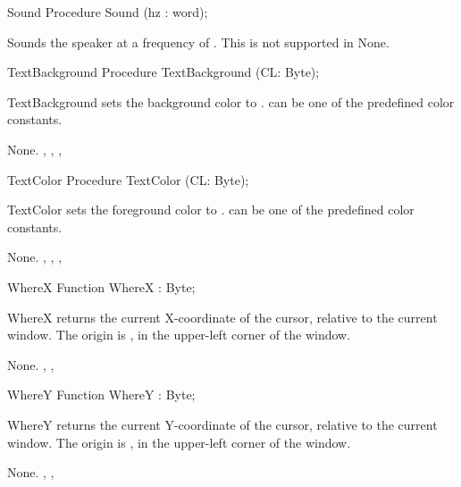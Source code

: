  \html{}
\begin{procedure}{Sound}
\Declaration
Procedure Sound (hz : word);

\Description
 Sounds the speaker at a frequency of .
This is not supported in \linux
\Errors
None.
\SeeAlso
{}
\end{procedure}
\begin{procedure}{TextBackground}
\Declaration
Procedure TextBackground (CL: Byte);

\Description

TextBackground sets the background color to .  can be one of the
predefined color constants.

\Errors
None.
\SeeAlso
 , , ,
\end{procedure}
 \html{}
\begin{procedure}{TextColor}
\Declaration
Procedure TextColor (CL: Byte);

\Description

TextColor sets the foreground color to .  can be one of the
predefined color constants.

\Errors
None.
\SeeAlso
 , , ,
\end{procedure}
 \html{}
\begin{function}{WhereX}
\Declaration
Function WhereX  : Byte;

\Description

WhereX returns the current X-coordinate of the cursor, relative to the
current window. The origin is , in the upper-left corner of the
window.

\Errors
None.
\SeeAlso
 , ,  
\end{function}
 \html{}
\begin{function}{WhereY}
\Declaration
Function WhereY  : Byte;

\Description

WhereY returns the current Y-coordinate of the cursor, relative to the
current window. The origin is , in the upper-left corner of the
window.

\Errors
None.
\SeeAlso
 , ,  
\end{function}
